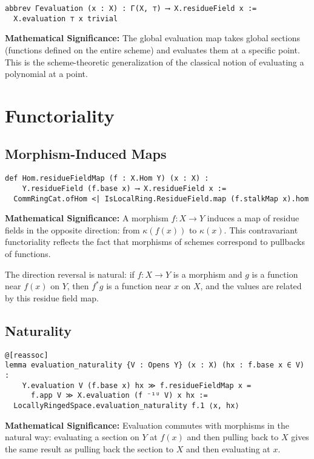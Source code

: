 \documentclass{article}
\theoremstyle{definition}
\begin{document}
\begin{lstlisting}
abbrev Γevaluation (x : X) : Γ(X, ⊤) ⟶ X.residueField x :=
  X.evaluation ⊤ x trivial
\end{lstlisting}

\textbf{Mathematical Significance:} The global evaluation map takes global sections (functions defined on the entire scheme) and evaluates them at a specific point. This is the scheme-theoretic generalization of the classical notion of evaluating a polynomial at a point.

\section{Functoriality}

\subsection{Morphism-Induced Maps}

\begin{lstlisting}
def Hom.residueFieldMap (f : X.Hom Y) (x : X) :
    Y.residueField (f.base x) ⟶ X.residueField x :=
  CommRingCat.ofHom <| IsLocalRing.ResidueField.map (f.stalkMap x).hom
\end{lstlisting}

\textbf{Mathematical Significance:} A morphism $f: X \to Y$ induces a map of residue fields in the opposite direction: from $\kappa(f(x))$ to $\kappa(x)$. This contravariant functoriality reflects the fact that morphisms of schemes correspond to pullbacks of functions.

The direction reversal is natural: if $f: X \to Y$ is a morphism and $g$ is a function near $f(x)$ on $Y$, then $f^*g$ is a function near $x$ on $X$, and the values are related by this residue field map.

\subsection{Naturality}

\begin{lstlisting}
@[reassoc]
lemma evaluation_naturality {V : Opens Y} (x : X) (hx : f.base x ∈ V) :
    Y.evaluation V (f.base x) hx ≫ f.residueFieldMap x =
      f.app V ≫ X.evaluation (f ⁻¹ᵁ V) x hx :=
  LocallyRingedSpace.evaluation_naturality f.1 ⟨x, hx⟩
\end{lstlisting}

\textbf{Mathematical Significance:} Evaluation commutes with morphisms in the natural way: evaluating a section on $Y$ at $f(x)$ and then pulling back to $X$ gives the same result as pulling back the section to $X$ and then evaluating at $x$.
\end{document}
